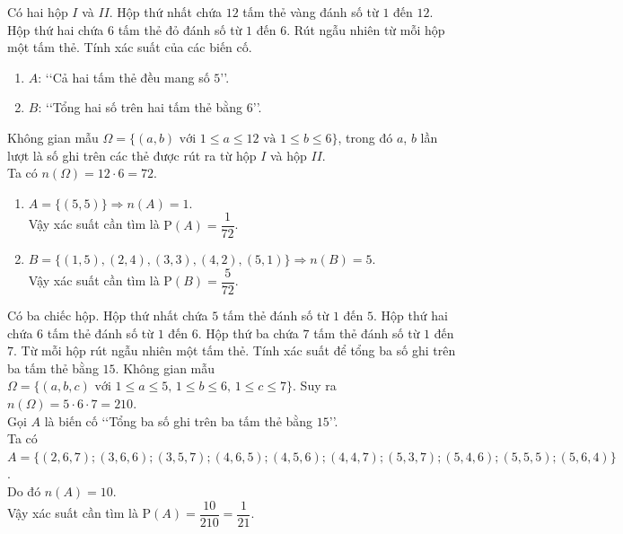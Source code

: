 \begin{ex}%
	Có hai hộp $I$ và $II$. Hộp thứ nhất chứa $12$ tấm thẻ vàng đánh số từ $1$ đến $12$. Hộp thứ hai chứa $6$ tấm thẻ đỏ đánh số từ $1$ đến $6$. Rút ngẫu nhiên từ mỗi hộp một tấm thẻ. Tính xác suất của các biến cố.
	\begin{enumerate}
		\item $A$: \lq\lq Cả hai tấm thẻ đều mang số $5$\rq\rq.
		\item $B$: \lq\lq Tổng hai số trên hai tấm thẻ bằng $6$\rq\rq.
	\end{enumerate}
	\loigiai
	{
		Không gian mẫu $\Omega= \{(a,b) \text{ với } 1\le a\le 12 \text{ và } 1\le b\le 6\}$, trong đó $a$, $b$ lần lượt là số ghi trên các thẻ được rút ra từ hộp $I$ và hộp $II$.\\
		Ta có $n(\Omega)= 12\cdot 6=72$.
		\begin{enumerate}
			\item $A= \{(5,5)\} \Rightarrow n(A)=1$.\\
			Vậy xác suất cần tìm là $\mathrm{P}(A)= \dfrac{1}{72}$.
			\item $B= \{(1,5), (2,4), (3,3), (4,2), (5,1)\} \Rightarrow n(B)=5$.\\
			Vậy xác suất cần tìm là $\mathrm{P}(B)= \dfrac{5}{72}$.
		\end{enumerate}
	}
\end{ex}

\begin{ex}%
	Có ba chiếc hộp. Hộp thứ nhất chứa $5$ tấm thẻ đánh số từ $1$ đến $5$. Hộp thứ hai chứa $6$ tấm thẻ đánh số từ $1$ đến $6$. Hộp thứ ba chứa $7$ tấm thẻ đánh số từ $1$ đến $7$. Từ mỗi hộp rút ngẫu nhiên một tấm thẻ. Tính xác suất để tổng ba số ghi trên ba tấm thẻ bằng $15$.
	\loigiai
	{
		Không gian mẫu $\Omega= \{(a,b,c) \text{ với } 1\le a\le 5,\, 1 \le b\le 6,\, 1\le c\le 7\}$. Suy ra $n(\Omega)= 5\cdot 6\cdot 7 = 210$.\\
		Gọi $A$ là biến cố \lq\lq Tổng ba số ghi trên ba tấm thẻ bằng $15$\rq\rq.\\
		Ta có $A=\{(2,6,7); (3,6,6); (3,5,7); (4,6,5); (4,5,6); (4,4,7); (5,3,7); (5,4,6); (5,5,5); (5,6,4)\}$.\\
		Do đó $n(A)=10$.\\
		Vậy xác suất cần tìm là $\mathrm{P}(A)= \dfrac{10}{210}= \dfrac{1}{21}$.
	}
\end{ex}

